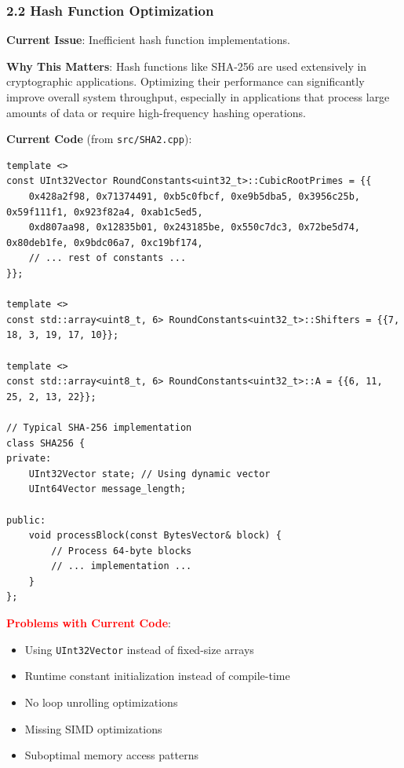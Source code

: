 \documentclass[11pt,a4paper]{article}
\begin{document}
\subsubsection{2.2 Hash Function Optimization}

\textbf{Current Issue}: Inefficient hash function implementations.

\textbf{Why This Matters}: Hash functions like SHA-256 are used extensively in cryptographic applications. Optimizing their performance can significantly improve overall system throughput, especially in applications that process large amounts of data or require high-frequency hashing operations.

\textbf{Current Code} (from \texttt{src/SHA2.cpp}):
\begin{lstlisting}
template <>
const UInt32Vector RoundConstants<uint32_t>::CubicRootPrimes = {{
    0x428a2f98, 0x71374491, 0xb5c0fbcf, 0xe9b5dba5, 0x3956c25b, 0x59f111f1, 0x923f82a4, 0xab1c5ed5,
    0xd807aa98, 0x12835b01, 0x243185be, 0x550c7dc3, 0x72be5d74, 0x80deb1fe, 0x9bdc06a7, 0xc19bf174,
    // ... rest of constants ...
}};

template <>
const std::array<uint8_t, 6> RoundConstants<uint32_t>::Shifters = {{7, 18, 3, 19, 17, 10}};

template <>
const std::array<uint8_t, 6> RoundConstants<uint32_t>::A = {{6, 11, 25, 2, 13, 22}};

// Typical SHA-256 implementation
class SHA256 {
private:
    UInt32Vector state; // Using dynamic vector
    UInt64Vector message_length;
    
public:
    void processBlock(const BytesVector& block) {
        // Process 64-byte blocks
        // ... implementation ...
    }
};
\end{lstlisting}

\textcolor{red}{\textbf{Problems with Current Code}}:
\begin{itemize}
    \item Using \texttt{UInt32Vector} instead of fixed-size arrays
    \item Runtime constant initialization instead of compile-time
    \item No loop unrolling optimizations
    \item Missing SIMD optimizations
    \item Suboptimal memory access patterns
\end{itemize}
\end{document}
